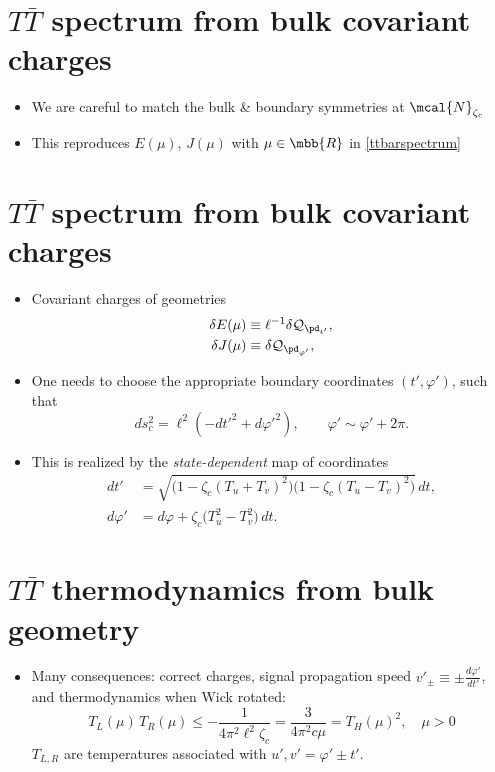 \documentclass[11pt]{article}
\renewenvironment{frame}[1]%
	{\section*{#1}}%
	{}
\newcommand{\TTbar}{\texorpdfstring{\ensuremath{T\bar{T}}}{TTbar}\xspace}
\begin{document}
\begin{multicols}{3}
\begin{frame}{\TTbar spectrum from bulk covariant charges}{%
	\textcite{Kraus:2021cwf,Apolo:2023vnm}
}
\begin{itemize}
\item We are careful to match the bulk \& boundary symmetries at $\mcal{N}_{\zeta_c}$

\item This reproduces $E(\mu)$, $J(\mu)$ with $\mu \in\mbb{R}$ in \eqref{ttbarspectrum}
	
\end{itemize}

\end{frame}


\begin{frame}{\TTbar spectrum from bulk covariant charges}{%
	\textcite{Kraus:2021cwf,Apolo:2023vnm}
}

\begin{itemize}
\item Covariant charges of geometries
	\begin{align*}
		\delta E(\mu) &\equiv  \ell^{-1} \delta \mathcal Q_{\pd_{t'}}, \\ \delta J(\mu) &\equiv  \delta \mathcal Q_{\pd_{\varphi'}},
	\end{align*}

\item One needs to choose the appropriate boundary coordinates $(t',\varphi')$, such that
	\begin{equation}
		ds^2_c = \ell^2 ( -dt'^2 + d\varphi'^2) , \qquad \varphi' \sim \varphi' + 2\pi.\label{cutoffmetric}
	\end{equation}



\item This is realized by the \textit{state-dependent} map of coordinates
	\begin{align*}
		dt' &= \sqrt{ \big(1 - \zeta_c (T_u+T_v)^2 \big) \big(1 - \zeta_c (T_u-T_v)^2 \big) } \, dt,  \\
		 d\varphi' &= d\varphi + \zeta_c \big( T_u^2 - T_v^2 \big)\,dt.
	\end{align*}
\end{itemize}

\end{frame}

\begin{frame}{\TTbar thermodynamics from bulk geometry}{%
	\textcite{Giveon:2017nie,Apolo:2019zai}
}

\begin{itemize}

\item Many consequences: correct charges, signal propagation speed $v'_{\pm} \equiv \pm \frac{d\varphi'}{dt'}$, and thermodynamics when Wick rotated:
	\begin{equation}
		T_L(\mu)\,T_R(\mu) \le - \frac{1}{4\pi^2 \ell^2 \zeta_c} = \frac{3}{4\pi^2c\mu} = T_H(\mu)^2,
	\quad \mu > 0
	\end{equation}
	$T_{L,R}$ are temperatures associated with $u',v' = \varphi' \pm t'$.


\end{itemize}
\end{frame}
\end{multicols}
\end{document}
